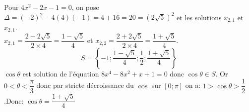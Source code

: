 \documentclass[a4paper,french,bookmarks]{article}
\begin{document}
\begin{enumerate}
\begin{tcolorbox}[colback=black!8,colframe=black!9,boxrule=.25pt,enhanced,arc is angular,arc=0pt]
    Pour $4x^2-2x-1=0$, on pose $\Delta = (-2)^2-4(4)(-1)=4+16=20=(2\sqrt{5})^2$ et les solutions $x_{2,1}$ et $x_{2,1}$.\\
    $x_{2,1} = \dfrac{2-2\sqrt{5}}{2\times4} =\dfrac{1-\sqrt{5}}{4}$ \quad et \quad $x_{2,2} = \dfrac{2+2\sqrt{5}}{2\times4} =\dfrac{1+\sqrt{5}}{4}$.\\
    \[ S = \left\lbrace-1;\dfrac{1-\sqrt{5}}{4};\dfrac{1}{2};\dfrac{1+\sqrt{5}}{4}\right\rbrace\]
    $\cos \theta$ est solution de l'équation $8x^4-8x^2+x+1=0$ donc $\cos \theta \in S$. Or $0 < \theta < \dfrac{\pi}{3}$ donc par stricte décroissance du $\cos$ sur $\left[0;\pi\right]$ on a: $1 > \cos \theta > \dfrac{1}{2}$.\qquad  Donc:
    $\displaystyle\boxed{\cos \theta = \dfrac{1+\sqrt{5}}{4}}$
    \end{tcolorbox}
\end{enumerate}
\end{document}

